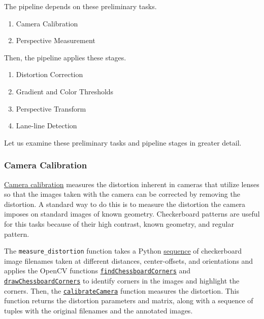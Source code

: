 \documentclass[11pt]{article}
\begin{document}
The pipeline depends on these preliminary tasks.

\begin{enumerate}
\item Camera Calibration
\item Perspective Measurement
\end{enumerate}

Then, the pipeline applies these stages.

\begin{enumerate}
\item Distortion Correction
\item Gradient and Color Thresholds
\item Perspective Transform
\item Lane-line Detection
\end{enumerate}

Let us examine these preliminary tasks and pipeline stages in
greater detail.

\subsubsection*{Camera Calibration}
\label{sec-1-2-1}

\href{http://docs.opencv.org/2.4/modules/calib3d/doc/camera_calibration_and_3d_reconstruction.html}{Camera calibration} measures the distortion inherent in cameras
that utilize lenses so that the images taken with the camera can
be corrected by removing the distortion.  A standard way to do
this is to measure the distortion the camera imposes on standard
images of known geometry.  Checkerboard patterns are useful for
this tasks because of their high contrast, known geometry, and
regular pattern.

The \texttt{measure\_distortion} function takes a Python \href{https://docs.python.org/2/library/stdtypes.html#sequence-types-str-unicode-list-tuple-bytearray-buffer-xrange}{sequence} of
checkerboard image filenames taken at different distances,
center-offsets, and orientations and applies the OpenCV
functions \href{http://docs.opencv.org/2.4/modules/calib3d/doc/camera_calibration_and_3d_reconstruction.html#findchessboardcorners}{\texttt{findChessboardCorners}} and \href{http://docs.opencv.org/2.4/modules/calib3d/doc/camera_calibration_and_3d_reconstruction.html#drawchessboardcorners}{\texttt{drawChessboardCorners}} to
identify corners in the images and highlight the corners.  Then,
the \href{http://docs.opencv.org/2.4/modules/calib3d/doc/camera_calibration_and_3d_reconstruction.html#calibratecamera}{\texttt{calibrateCamera}} function measures the distortion.  This
function returns the distortion parameters and matrix, along
with a sequence of tuples with the original filenames and the
annotated images.
\end{document}
